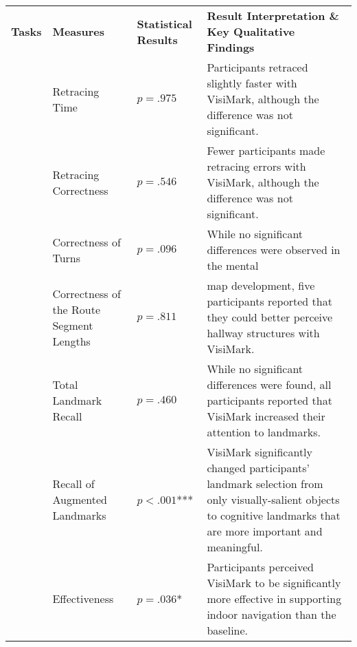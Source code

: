 \begin{table*}[h]
\centering
\small
\begin{tabular}{>{\raggedright\arraybackslash\color{brownishred}}m{3cm} >{\raggedright\arraybackslash\color{brownishred}}m{3cm} >{\raggedright\arraybackslash\color{brownishred}}m{1.7cm}
>{\arraybackslash\arraybackslash\color{brownishred}}m{8.5cm}}
\Xhline{2\arrayrulewidth}
\textbf{Tasks} & \textbf{Measures} & \textbf{Statistical Results} & \textbf{Result Interpretation \& Key Qualitative Findings} \\
\Xhline{2\arrayrulewidth}
\multirow{4}{*}{Retracing Performance}& Retracing Time&$p=.975$&Participants retraced slightly faster with VisiMark, although the difference was not significant.\\
\cline{2-4}
& Retracing Correctness& $p=.546$&Fewer participants made retracing errors with VisiMark, although the difference was not significant.\\
\hline
\multirow{8}{*}{Mental Map Development}& Correctness of Turns& $p=.096$&While no significant differences were observed in the mental\\
\cline{2-3}
& Correctness of the Route Segment Lengths&$p=.811$& map development, five participants reported that they could better perceive hallway structures with VisiMark.\\
\cline{2-4}
\multirow{3}{*}{}& Total Landmark Recall& $p=.460$&While no significant differences were found, all participants reported that VisiMark increased their attention to landmarks.\\
\cline{2-4}
& Recall of Augmented Landmarks& $p<.001$***&VisiMark significantly changed participants' landmark selection from only visually-salient objects to cognitive landmarks that are more important and meaningful.\\
\hline
\multirow{8}{*}{Subjective Experiences}& Effectiveness & $p=.036$*& Participants perceived VisiMark to be significantly more effective in supporting indoor navigation than the baseline.\\

\end{tabular}
\end{table*}

